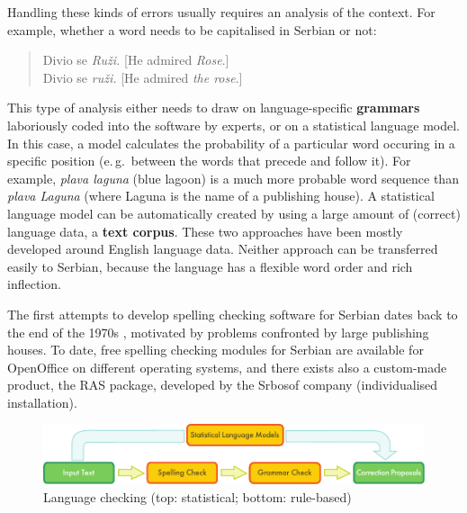 \begin{multicols}{2}
Handling these kinds of errors usually requires an analysis of the context. For example, whether a word needs to be capitalised in Serbian or not:

\begin{quote}
Divio se \textit{Ruži.} [He admired \textit{Rose}.]\\
Divio se \textit{ruži.} [He admired \textit{the rose}.]
\end{quote}

This type of analysis either needs to draw on language-specific \textbf{grammars} laboriously coded into the software by experts, or on a statistical language model. In this case, a model calculates the probability of a particular word occuring in a specific position (e.\,g.~between the words that precede and follow it). For example, \textit{plava laguna} (blue lagoon) is a much more probable word sequence than \textit{plava Laguna} (where Laguna is the name of a publishing house). A statistical language model can be automatically created by using a large amount of (correct) language data, a \textbf{text corpus}. These two approaches have been mostly developed around English language data. Neither approach can be transferred easily to Serbian, because the language has a flexible word order and rich inflection.


The first attempts to develop spelling checking software for Serbian dates back to the end of the 1970s \cite{UROSEVIC}, motivated by problems confronted by large publishing houses. To date, free spelling checking modules for Serbian are available for OpenOffice \cite{OpenOffice} on different operating systems, and there exists also a custom-made product, the RAS package, \cite{RASPROG} developed by the Srbosof company (individualised installation).  
 
\begin{figure}[htb]
  \center
  \includegraphics[width=\textwidth]{../_media/english/language_checking}
  \caption{Language checking (top: statistical; bottom: rule-based)}
  \label{fig:langcheckingaarch_en}
\end{figure}


\end{multicols}
